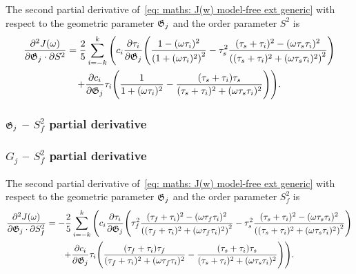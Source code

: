 The second partial derivative of~\eqref{eq: maths: J(w) model-free ext generic} with respect to the geometric parameter $\mathfrak{G}_j$ and the order parameter $S^2$ is
\begin{multline}
    \frac{\partial^2 J(\omega)}{\partial \mathfrak{G}_j \cdot \partial S^2} = \frac{2}{5} \sum_{i=-k}^k \Bigg(
        c_i \frac{\partial \tau_i}{\partial \mathfrak{G}_j} \Bigg(
            \frac{1 - (\omega \tau_i)^2}{\left(1 + (\omega \tau_i)^2 \right)^2}
            - \tau_s^2 \frac{(\tau_s + \tau_i)^2 - (\omega \tau_s \tau_i)^2}{\left((\tau_s + \tau_i)^2 + (\omega \tau_s \tau_i)^2 \right)^2}
        \Bigg) \\
        +  \frac{\partial c_i}{\partial \mathfrak{G}_j} \tau_i \Bigg(
            \frac{1}{1 + (\omega \tau_i)^2}
            - \frac{(\tau_s + \tau_i)\tau_s}{(\tau_s + \tau_i)^2 + (\omega \tau_s \tau_i)^2}
        \Bigg)
    \Bigg).
\end{multline}



\begin{latexonly}
    \subsubsection{$\mathfrak{G}_j$ -- $S^2_f$ partial derivative}
\end{latexonly}
\begin{htmlonly}
    \subsubsection{$G_j$ -- $S^2_f$ partial derivative}
\end{htmlonly}

The second partial derivative of~\eqref{eq: maths: J(w) model-free ext generic} with respect to the geometric parameter $\mathfrak{G}_j$ and the order parameter $S^2_f$ is
\begin{multline}
    \frac{\partial^2 J(\omega)}{\partial \mathfrak{G}_j \cdot \partial S^2_f} = -\frac{2}{5} \sum_{i=-k}^k \Bigg(
        c_i \frac{\partial \tau_i}{\partial \mathfrak{G}_j} \Bigg(
            \tau_f^2 \frac{(\tau_f + \tau_i)^2 - (\omega \tau_f \tau_i)^2}{\left((\tau_f + \tau_i)^2 + (\omega \tau_f \tau_i)^2 \right)^2}
            - \tau_s^2 \frac{(\tau_s + \tau_i)^2 - (\omega \tau_s \tau_i)^2}{\left((\tau_s + \tau_i)^2 + (\omega \tau_s \tau_i)^2 \right)^2}
        \Bigg) \\
        +  \frac{\partial c_i}{\partial \mathfrak{G}_j} \tau_i \Bigg(
            \frac{(\tau_f + \tau_i)\tau_f}{(\tau_f + \tau_i)^2 + (\omega \tau_f \tau_i)^2}
            - \frac{(\tau_s + \tau_i)\tau_s}{(\tau_s + \tau_i)^2 + (\omega \tau_s \tau_i)^2}
        \Bigg)
    \Bigg).
\end{multline}



